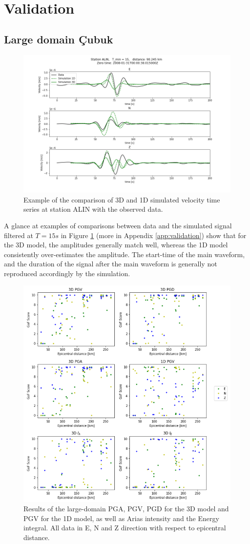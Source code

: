 \documentclass[../Text/00main.tex]{subfiles}
\begin{document}

\section{Validation}

\subsection{Large domain Çubuk}

\begin{figure}
    \centering
    \includegraphics[width=0.5\linewidth]{images_results/KO.ALIN_15s_1D.png}
    \caption{Example of the comparison of 3D and 1D simulated velocity time series at station ALIN with the observed data. }
    \label{fig:ALINwv}
\end{figure}

A glance at examples of comparisons between data and the simulated signal filtered at $T = 15 s$ in Figure \ref{fig:ALINwv} (more in Appendix \ref{app:validation}) show that for the 3D model, the amplitudes generally match well, whereas the 1D model consistently over-estimates the amplitude. The start-time of the main waveform, and the duration of the signal after the main waveform is generally not reproduced accordingly by the simulation. 

\begin{figure}
    \centering
    \includegraphics[width=.5\linewidth]{images_results/GOF_epicentral.png}
    \caption{Results of the large-domain PGA, PGV, PGD for the 3D model and PGV for the 1D model, as well as Arias intensity and the Energy integral. All data in E, N and Z direction with respect to epicentral distance.}
    \label{fig:gofpot_epicentral_large}
\end{figure}
\end{document}
